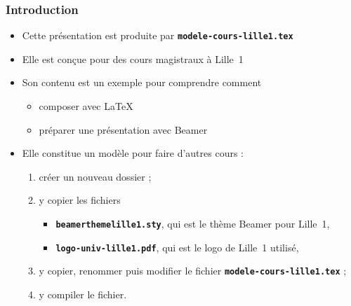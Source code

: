 \documentclass[10pt,t]{beamer}
\begin{document}
\begin{frame}%
  \frametitle{Introduction}


  \begin{itemize}
  \item Cette présentation est produite par \texttt{\textbf{modele-cours-lille1.tex}}
  \item Elle est conçue pour des cours magistraux à Lille~1
  \item Son contenu est un exemple pour comprendre comment

    \begin{itemize}
    \item composer avec \LaTeX{}
    \item préparer une présentation avec Beamer
    \end{itemize}

  \end{itemize}

  \pause


  \begin{itemize}
  \item Elle constitue un modèle pour faire d'autres cours :
      
    \begin{enumerate}
    \item créer un nouveau dossier ;
    \item y copier les fichiers 
      
      \begin{itemize}
      \item \texttt{\textbf{beamerthemelille1.sty}}, qui est le thème Beamer pour Lille~1,
      \item \texttt{\textbf{logo-univ-lille1.pdf}}, qui est le logo de Lille~1 utilisé,
      \end{itemize}
      
    \item y copier, renommer puis modifier le fichier \texttt{\textbf{modele-cours-lille1.tex}} ;
    \item y compiler le fichier.
    \end{enumerate}
  \end{itemize}

  \pause

\end{frame}
\end{document}
